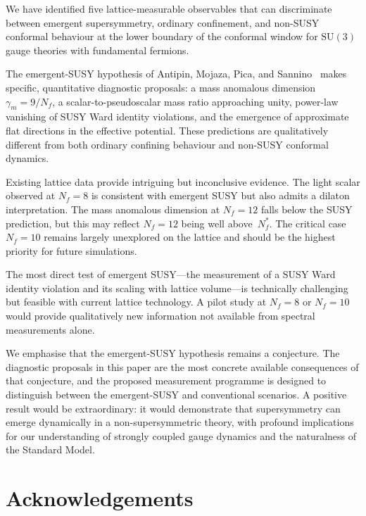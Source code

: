 \documentclass[11pt,a4paper]{article}
\theoremstyle{plain}
\theoremstyle{definition}
\theoremstyle{remark}
\newcommand{\Nf}{N_{\!f}}
\newcommand{\Nfstar}{\Nf^*}
\newcommand{\SU}[1]{\mathrm{SU}(#1)}
\begin{document}
We have identified five lattice-measurable observables that can
discriminate between emergent supersymmetry, ordinary confinement, and
non-SUSY conformal behaviour at the lower boundary of the conformal
window for $\SU{3}$ gauge theories with fundamental fermions.

The emergent-SUSY hypothesis of Antipin, Mojaza, Pica, and
Sannino~\cite{AMPS2013} makes specific, quantitative diagnostic proposals: a mass
anomalous dimension $\gamma_m = 9/\Nf$, a scalar-to-pseudoscalar mass
ratio approaching unity, power-law vanishing of SUSY Ward identity
violations, and the emergence of approximate flat directions in the
effective potential.  These predictions are qualitatively different
from both ordinary confining behaviour and non-SUSY conformal
dynamics.

Existing lattice data provide intriguing but inconclusive evidence.
The light scalar observed at $\Nf = 8$ is consistent with emergent SUSY
but also admits a dilaton interpretation.  The mass anomalous dimension
at $\Nf = 12$ falls below the SUSY prediction, but this may reflect
$\Nf = 12$ being well above~$\Nfstar$.  The critical case $\Nf = 10$
remains largely unexplored on the lattice and should be the highest
priority for future simulations.

The most direct test of emergent SUSY---the measurement of a SUSY Ward
identity violation and its scaling with lattice volume---is technically
challenging but feasible with current lattice technology.  A pilot
study at $\Nf = 8$ or $\Nf = 10$ would provide qualitatively new
information not available from spectral measurements alone.

We emphasise that the emergent-SUSY hypothesis remains a conjecture.
The diagnostic proposals in this paper are the most concrete available consequences
of that conjecture, and the proposed measurement programme is designed
to distinguish between the emergent-SUSY and conventional scenarios.  A positive result would be extraordinary:
it would demonstrate that supersymmetry can emerge dynamically in a
non-supersymmetric theory, with profound implications for our
understanding of strongly coupled gauge dynamics and the naturalness
of the Standard Model.


\section*{Acknowledgements}
\end{document}
